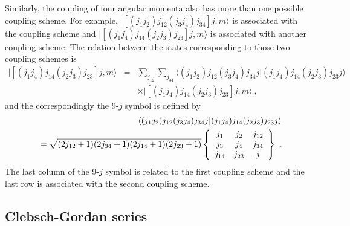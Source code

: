Similarly, the coupling of four angular momenta also has more than one possible coupling scheme. For example, 
  $|\left[(j_{1}j_{2})j_{12}(j_{3}j_{4})j_{34}\right] j, m \rangle$ is associated with the coupling scheme
and  $|\left[(j_{1}j_{4})j_{14}(j_{2}j_{3})j_{23}\right] j, m \rangle$ is associated with another coupling scheme:
The relation between the states corresponding to those two
coupling schemes is
\begin{eqnarray}
|\left[(j_{1}j_{4})j_{14}(j_{2}j_{3})j_{23}\right] j, m \rangle &=& \sum_{j_{12}}\sum_{j_{34}} \langle (j_{1}j_{2})j_{12}(j_{3}j_{4})j_{34}j  | (j_{1}j_{4})j_{14}(j_{2}j_{3})j_{23}j \rangle \nonumber \\
& & \times |\left[ (j_{1}j_{4})j_{14}(j_{2}j_{3})j_{23}\right] j, m \rangle \ , \label{9-j1}
\end{eqnarray}
and the correspondingly the 9-$j$ symbol is defined by\cite{zare-book}
\begin{eqnarray}
&&\langle  (j_{1}j_{2})j_{12}(j_{3}j_{4})j_{34}j  | (j_{1}j_{4})j_{14}(j_{2}j_{3})j_{23}j  \rangle \nonumber \\
& & = \sqrt{(2j_{12} + 1) (2j_{34} +1)(2j_{14}+1)(2j_{23} + 1)}
\left\{
\begin{array}{ccc}
j_{1}& j_{2}&j_{12} \\
j_{3}&j_{4}&j_{34} \\
j_{14}&j_{23}&j 
\end{array}
\right\} \ . \nonumber \\ \label{9-j2}
\end{eqnarray}
The last column of the 9-$j$ symbol is related to the first coupling scheme and the last row is 
associated with the second coupling scheme.

\subsection{Clebsch-Gordan series}

